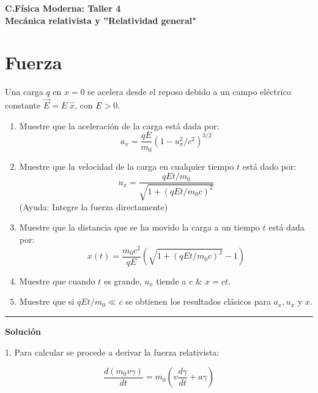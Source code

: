 \documentclass[12pt]{article}
\begin{document}
 
\begin{center}
\Large \textbf{C.Física Moderna: Taller 4}\\
\normalsize \textbf{Mecánica relativista y ''Relatividad general"}
\end{center}
 
  

\section{Fuerza}


 Una carga $q$ en $x = 0$ se acelera desde el reposo debido a un campo eléctrico constante
$\vec{E} = E \;\hat{x}$,
con $E > 0$.

\begin{enumerate}
	\item Muestre que la aceleración de la carga está dada por:
	\begin{equation}
	a_x = \frac{q E}{m_0} (1-u_x^2/c^2)^{3/2}
	\end{equation}
	\item  Muestre que la velocidad de la carga en cualquier tiempo $t$ está dado por:
	\begin{equation}
	u_x = \frac{qEt/m_0}{\sqrt{1+(qEt/m_0 c)^2}}
	\end{equation}
	(Ayuda: Integre la fuerza directamente)
	\item Muestre que la distancia que se ha movido la carga a un tiempo $t$ está dada por:
	\begin{equation}
	x(t) = \frac{m_0 c^2}{qE} \left(\sqrt{1+(qEt/m_0c)^2}-1\right)
	\end{equation}
	\item  Muestre que cuando $t$ es grande, $u_x$ tiende a $c$ \& $x = ct$.
	\item  Muestre que si $qEt/m_0 \ll c$ se obtienen los resultados clásicos para $a_x , u_x$ y $x$.
\end{enumerate}



\noindent\rule{16.5cm}{0.4pt}


\begin{center}
	\textbf{Solución}
\end{center}


1. Para calcular se procede a derivar la fuerza relativista:

\begin{equation}
\frac{d( m_0 v \gamma)}{dt} = m_0 \left(v\frac{d\gamma}{dt}+ a \gamma\right)
\end{equation}
\end{document}
